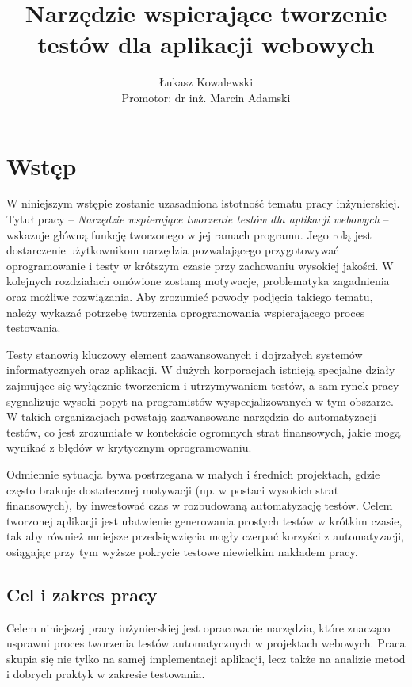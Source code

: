 \documentclass[12pt]{report}
\title{Narzędzie wspierające tworzenie testów dla aplikacji webowych}
\author{
    Łukasz Kowalewski \\ %
    \vspace{0.5cm} %
    Promotor: dr inż. Marcin Adamski %
}
\date{}
\begin{document}
\maketitle

\tableofcontents
\newpage

\chapter{Wstęp}
W niniejszym wstępie zostanie uzasadniona istotność tematu pracy inżynierskiej. Tytuł pracy -- \emph{Narzędzie wspierające tworzenie testów dla aplikacji webowych} -- wskazuje główną funkcję tworzonego w jej ramach programu. Jego rolą jest dostarczenie użytkownikom narzędzia pozwalającego przygotowywać oprogramowanie i testy w krótszym czasie przy zachowaniu wysokiej jakości. W kolejnych rozdziałach omówione zostaną motywacje, problematyka zagadnienia oraz możliwe rozwiązania. Aby zrozumieć powody podjęcia takiego tematu, należy wykazać potrzebę tworzenia oprogramowania wspierającego proces testowania.

Testy stanowią kluczowy element zaawansowanych i dojrzałych systemów informatycznych oraz aplikacji. W dużych korporacjach istnieją specjalne działy zajmujące się wyłącznie tworzeniem i utrzymywaniem testów, a sam rynek pracy sygnalizuje wysoki popyt na programistów wyspecjalizowanych w tym obszarze. W takich organizacjach powstają zaawansowane narzędzia do automatyzacji testów, co jest zrozumiałe w kontekście ogromnych strat finansowych, jakie mogą wynikać z błędów w krytycznym oprogramowaniu.

Odmiennie sytuacja bywa postrzegana w małych i średnich projektach, gdzie często brakuje dostatecznej motywacji (np. w postaci wysokich strat finansowych), by inwestować czas w rozbudowaną automatyzację testów. Celem tworzonej aplikacji jest ułatwienie generowania prostych testów w krótkim czasie, tak aby również mniejsze przedsięwzięcia mogły czerpać korzyści z automatyzacji, osiągając przy tym wyższe pokrycie testowe niewielkim nakładem pracy.

\section{Cel i zakres pracy}
Celem niniejszej pracy inżynierskiej jest opracowanie narzędzia, które znacząco usprawni proces tworzenia testów automatycznych w projektach webowych. Praca skupia się nie tylko na samej implementacji aplikacji, lecz także na analizie metod i dobrych praktyk w zakresie testowania.
\end{document}
